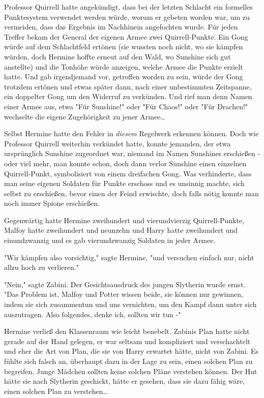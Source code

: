 {Professor Quirrell hatte angekündigt, dass bei der letzten Schlacht ein formelles Punktesystem verwendet werden würde, worum er gebeten worden war, um zu vermeiden, dass das Ergebnis im Nachhinein angefochten wurde. Für jeden Treffer bekam der General der eigenen Armee zwei Quirrell-Punkte. Ein Gong würde auf dem Schlachtfeld ertönen (sie wussten noch nicht, wo sie kämpfen würden, doch Hermine hoffte erneut auf den Wald, wo Sunshine sich gut anstellte) und die Tonhöhe würde anzeigen, welche Armee die Punkte erzielt hatte. Und gab irgendjemand vor, getroffen worden zu sein, würde der Gong trotzdem ertönen und etwas später dann, nach einer unbestimmten Zeitspanne, ein doppelter Gong um den Widerruf zu verkünden. Und rief man denn Namen einer Armee aus, etwa "Für Sunshine!" oder "Für Chaos!" oder "Für Drachen!" wechselte die eigene Zugehörigkeit zu jener Armee…

Selbst Hermine hatte den Fehler in \emph{diesem} Regelwerk erkennen können. Doch wie Professor Quirrell weiterhin verkündet hatte, konnte jemanden, der etwa ursprünglich Sunshine zugeordnet war, niemand im Namen Sunshines erschießen - oder viel mehr, man konnte schon, doch dann verlor Sunshine einen einzelnen Quirrell-Punkt, symbolisiert von einem dreifachen Gong. Was verhinderte, dass man seine eigenen Soldaten für Punkte erschoss und es unsinnig machte, sich selbst zu erschießen, bevor einen der Feind erwischte, doch falls nötig konnte man noch immer Spione erschießen.

Gegenwärtig hatte Hermine zweihundert und vierundvierzig Quirrell-Punkte, Malfoy hatte zweihundert und neunzehn und Harry hatte zweihundert und einundzwanzig und es gab vierundzwanzig Soldaten in jeder Armee.

"Wir kämpfen also vorsichtig," sagte Hermine, "und versuchen einfach nur, nicht allzu hoch zu verlieren."

"Nein," sagte Zabini. Der Gesichtsausdruck des jungen Slytherin wurde ernst. "Das Problem ist, Malfoy und Potter wissen beide, sie können nur gewinnen, indem sie sich zusammentun und uns vernichten, um den Kampf dann unter sich auszutragen. Also folgendes, denke ich, sollten wir tun -"

Hermine verließ den Klassenraum wie leicht benebelt. Zabinis Plan hatte nicht gerade auf der Hand gelegen, er war seltsam und kompliziert und verschachtelt und eher die Art von Plan, die sie von Harry erwartet hätte, nicht von Zabini. Es fühlte sich falsch an, überhaupt dazu in der Lage zu sein, einen solchen Plan zu begreifen. Junge Mädchen sollten keine solchen Pläne verstehen können. Der Hut hätte sie nach Slytherin geschickt, hätte er gesehen, dass sie dazu fähig wäre, einen solchen Plan zu verstehen…

}
